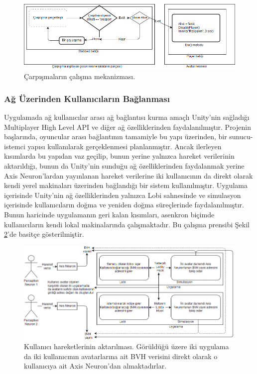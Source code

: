 \documentclass[a4paper, 12pt, titlepage]{article}
\begin{document}
\begin{figure}[hbt!]
    \centering
        \includegraphics[width=6in]{images/col}
    \caption{Çarpışmaların çalışma mekanizması.}
    \label{col}
\end{figure}

\subsubsection{Ağ Üzerinden Kullanıcıların Bağlanması}
Uygulamada ağ kullanıcılar arası ağ bağlantısı kurma amaçlı Unity’nin sağladığı Multiplayer High
Level API ve diğer ağ özelliklerinden faydalanılmıştır. Projenin başlarında, oyuncular arası
bağlantının tamamiyle bu yapı üzerinden, bir sunucu-istemci yapısı kullanılarak gerçeklenmesi
planlanmıştır. Ancak ilerleyen kısımlarda bu yapıdan vaz geçilip, bunun yerine yalnızca hareket
verilerinin aktarıldığı, bunun da Unity’nin sunduğu ağ özelliklerinden faydalanmak yerine Axis
Neuron’lardan yayınlanan hareket verilerine iki kullanıcının da direkt olarak kendi yerel
makinaları üzerinden bağlandığı bir sistem kullanılmıştır. Uygulama içerisinde Unity’nin ağ
özelliklerinden yalnızca Lobi sahnesinde ve simulasyon içerisinde kullanıcıların doğma ve yeniden
doğma süreçlerinde faydalanılmıştır. Bunun haricinde uygulamanın geri kalan kısımları, asenkron
biçimde kullanıcıların kendi lokal makinalarında çalışmaktadır. Bu çalışma prensibi Şekil
\ref{net}’de basitçe gösterilmiştir.

\begin{figure}[hbt!]
    \centering
        \includegraphics[width=6in]{images/net}
    \caption{Kullanıcı hareketlerinin aktarılması. Görüldüğü üzere iki uygulama da iki kullanıcının
             avatarlarına ait BVH verisini direkt olarak o kullanıcıya ait Axis Neuron’dan
             almaktadırlar.}
    \label{net}
\end{figure}
\end{document}
